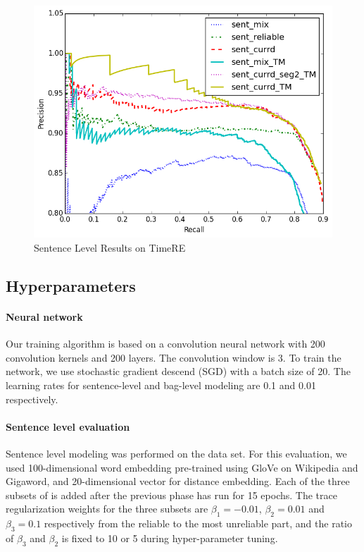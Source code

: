 \begin{figure}[t!]
\begin{center}
\includegraphics[width=0.9\linewidth]{figures/sent_time_exp_overall.png}
\caption{Sentence Level Results on TimeRE}
\label{fig: sent_luo}
\end{center}
\end{figure}


\subsection{Hyperparameters}

\paragraph{Neural network} Our training algorithm is based on a convolution neural network with 200 convolution kernels and 200 layers.
The convolution window is 3. To train the network, we use stochastic gradient descend (SGD) with a batch size of 20.  The learning rates for sentence-level
 and bag-level modeling are 0.1 and 0.01 respectively.


\paragraph{Sentence level evaluation}
Sentence level modeling was performed on the \TimeRE data set. For this evaluation,  we used 100-dimensional word embedding pre-trained using GloVe \cite{pennington2014glove} on Wikipedia and Gigaword, and 20-dimensional vector for distance embedding. Each of the three subsets of \TimeRE is added after the previous phase has run for 15 epochs. The trace regularization weights for the three subsets are $\beta_1=-0.01$, $\beta_2=0.01$ and $\beta_3=0.1$ respectively from the reliable to the most unreliable part, and the ratio of $\beta_3$ and $\beta_2$ is fixed to 10 or 5 during hyper-parameter tuning.

